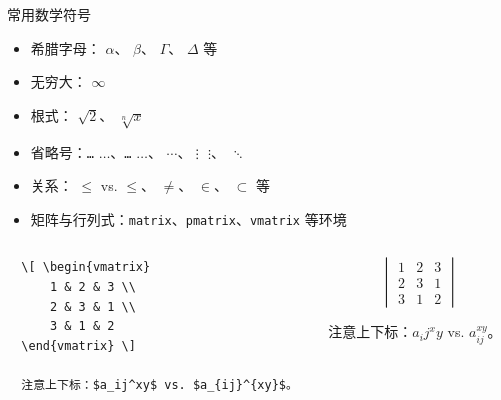   \begin{frame}[fragile]{常用数学符号}
  \begin{itemize}
      \item 希腊字母：\texttt{\alpha} $\alpha$、\texttt{\beta} $\beta$、\texttt{\Gamma} $\Gamma$、\texttt{\Delta} $\Delta$ 等
      \item 无穷大：\texttt{\infty} $\infty$
      \item 根式：\texttt{} $\sqrt{2}$、\texttt{} $\sqrt[n]{x}$
      \item 省略号：\texttt{\dots} $\dots$、\texttt{\ldots} $\ldots$、\texttt{\cdots} $\cdots$、\texttt{\vdots} $\vdots$、\texttt{\ddots} $\ddots$
      \item 关系：\texttt{\leq} $\leq$ vs. \texttt{\leqslant} $\leqslant$、\texttt{\neq} $\neq$、\texttt{\in} $\in$、\texttt{\subset} $\subset$ 等
      \item 矩阵与行列式：\texttt{matrix}、\texttt{pmatrix}、\texttt{vmatrix} 等环境
  \end{itemize}
  \pause
  \begin{columns}
      \begin{column}{0.65\textwidth}
          \begin{verbatim}
  \[ \begin{vmatrix}
      1 & 2 & 3 \\
      2 & 3 & 1 \\
      3 & 1 & 2
  \end{vmatrix} \]
  
  注意上下标：$a_ij^xy$ vs. $a_{ij}^{xy}$。
          \end{verbatim}
      \end{column}
      \begin{column}{0.35\textwidth}\small
  \[ \begin{vmatrix}
      1 & 2 & 3 \\
      2 & 3 & 1 \\
      3 & 1 & 2
  \end{vmatrix} \]
  
  注意上下标：$a_ij^xy$ vs. $a_{ij}^{xy}$。
      \end{column}
  \end{columns}
  \end{frame}
  
